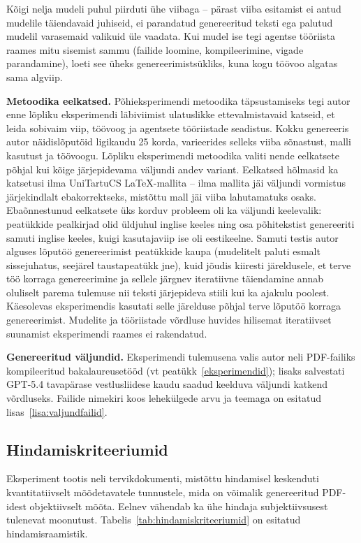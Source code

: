 Kõigi nelja mudeli puhul piirduti ühe viibaga -- pärast viiba esitamist ei antud mudelile täiendavaid juhiseid, ei parandatud genereeritud teksti ega palutud mudelil varasemaid valikuid üle vaadata. Kui mudel ise tegi agentse tööriista raames mitu sisemist sammu (failide loomine, kompileerimine, vigade parandamine), loeti see üheks genereerimistsükliks, kuna kogu töövoo algatas sama algviip.

\textbf{Metoodika eelkatsed.} Põhieksperimendi metoodika täpsustamiseks tegi autor enne lõpliku eksperimendi läbiviimist ulatuslikke ettevalmistavaid katseid, et leida sobivaim viip, töövoog ja agentsete tööriistade seadistus. Kokku genereeris autor näidislõputöid ligikaudu 25 korda, varieerides selleks viiba sõnastust, malli kasutust ja töövoogu. Lõpliku eksperimendi metoodika valiti nende eelkatsete põhjal kui kõige järjepidevama väljundi andev variant. Eelkatsed hõlmasid ka katsetusi ilma UniTartuCS \LaTeX{}-mallita -- ilma mallita jäi väljundi vormistus järjekindlalt ebakorrektseks, mistõttu mall jäi viiba lahutamatuks osaks. Ebaõnnestunud eelkatsete üks korduv probleem oli ka väljundi keelevalik: peatükkide pealkirjad olid üldjuhul inglise keeles ning osa põhitekstist genereeriti samuti inglise keeles, kuigi kasutajaviip ise oli eestikeelne. Samuti testis autor alguses lõputöö genereerimist peatükkide kaupa (mudelitelt paluti esmalt sissejuhatus, seejärel taustapeatükk jne), kuid jõudis kiiresti järeldusele, et terve töö korraga genereerimine ja sellele järgnev iteratiivne täiendamine annab oluliselt parema tulemuse nii teksti järjepideva stiili kui ka ajakulu poolest. Käesolevas eksperimendis kasutati selle järelduse põhjal terve lõputöö korraga genereerimist. Mudelite ja tööriistade võrdluse huvides hilisemat iteratiivset suunamist eksperimendi raames ei rakendatud.

\textbf{Genereeritud väljundid.} Eksperimendi tulemusena valis autor neli PDF-failiks kompileeritud bakalaureusetööd (vt peatükk~\ref{eksperimendid}); lisaks salvestati GPT-5.4 tavapärase vestlusliidese kaudu saadud keelduva väljundi katkend võrdluseks. Failide nimekiri koos lehekülgede arvu ja teemaga on esitatud lisas~\ref{lisa:valjundfailid}.

\subsection{Hindamiskriteeriumid} \label{subsec:hindamiskriteeriumid}

Eksperiment tootis neli tervikdokumenti, mistõttu hindamisel keskenduti kvantitatiivselt mõõdetavatele tunnustele, mida on võimalik genereeritud PDF-idest objektiivselt mõõta. Eelnev vähendab ka ühe hindaja subjektiivsusest tulenevat moonutust. Tabelis~\ref{tab:hindamiskriteeriumid} on esitatud hindamisraamistik.

